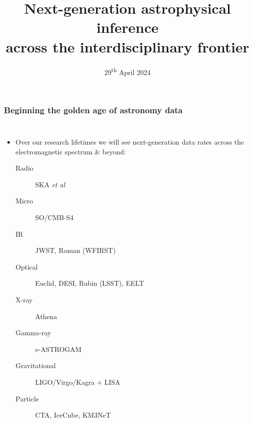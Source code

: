 \documentclass[aspectratio=169]{beamer}
\title{Next-generation astrophysical inference\\across the interdisciplinary frontier}
\date{29\textsuperscript{th} April 2024}
\begin{document}
\begin{frame}
    \titlepage
\end{frame}

\begin{frame}
    \frametitle{Beginning the golden age of astronomy data}
    \begin{columns}
        \begin{itemize}
            \item Over our research lifetimes we will see next-generation data rates across the electromagnetic spectrum \& beyond:
                \begin{description}
                    \item[Radio] SKA \textit{et al}
                    \item[Micro] SO/CMB-S4
                    \item[IR] JWST, Roman (WFIRST)
                    \item[Optical] Euclid, DESI, Rubin (LSST), EELT
                    \item[X-ray] Athena
                    \item[Gamma-ray] e-ASTROGAM
                    \item[Gravitational] LIGO/Virgo/Kagra + LISA
                    \item[Particle] CTA, IceCube, KM3NeT
                \end{description}
        \end{itemize}


\end{columns}
\end{frame}
\end{document}
